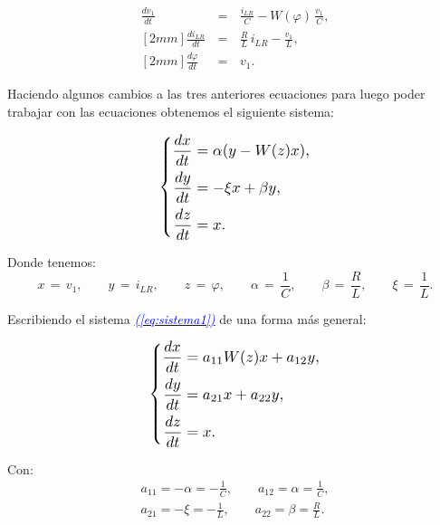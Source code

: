 \documentclass[12pt,a4paper]{report} %
\newcommand{\eref}[1]{\hyperref[#1]{\textcolor{blue}{\textit{(\ref*{#1})}}}}
\begin{document}
	\begin{eqnarray}
		\frac{dv_1}{dt}\,&=&\,\frac{i_{LR}}{C}-W(\varphi)\,\frac{v_1}{C} \label{eq:sis1}, \\ [2mm]
		\frac{di_{LR}}{dt}\,&=&\,\frac{R}{L}\,i_{LR}-\frac{v_1}{L} \label{eq:sis2}, \\ [2mm]
		\frac{d\varphi}{dt}\,&=&\,v_1. \label{eq:sis3}
	\end{eqnarray}\smallskip
	
	Haciendo algunos cambios a las tres anteriores ecuaciones para luego poder trabajar con las ecuaciones obtenemos el siguiente sistema:
    
	\begin{equation}
		\label{eq:sistema1}
		\scalebox{1.2}{$\displaystyle
			\left\{
			\begin{aligned}
				\frac{dx}{dt} &= \alpha (y - W(z)x), \\
				\frac{dy}{dt} &= -\xi x + \beta y, \\
				\frac{dz}{dt} &= x.
			\end{aligned}
			\right.
			$}
	\end{equation}\smallskip
	
	Donde tenemos:
	\begin{equation*}
		x\,=\,v_1, \qquad y\,=\,i_{LR}, \qquad z\,=\,\varphi, \qquad \alpha\,=\,\frac{1}{C}, \qquad \beta\,=\,\frac{R}{L}, \qquad \xi\,=\,\frac{1}{L}.
	\end{equation*}
	
	Escribiendo el sistema \eref{eq:sistema1} de una forma más general:
	
	\begin{equation}
		\label{eq:sistema}
		\scalebox{1.2}{$\displaystyle
			\left\{
			\begin{aligned}
				\frac{dx}{dt} &= a_{11}W(z)x+a_{12}y, \\
				\frac{dy}{dt} &=  a_{21}x+ a_{22}y, \\
				\frac{dz}{dt} &= x.
			\end{aligned}
			\right.
			$}
	\end{equation}\smallskip
	
	Con:
	\begin{equation}
		\label{eq:amatriz}
	\begin{gathered}
		a_{11}=-\alpha=-\frac{1}{C}, \qquad a_{12}=\alpha=\frac{1}{C},\\[2mm]
		a_{21}=-\xi =-\frac{1}{L}, \qquad a_{22}=\beta = \frac{R}{L}.
	\end{gathered}
	\end{equation}\smallskip
	
\end{document}
